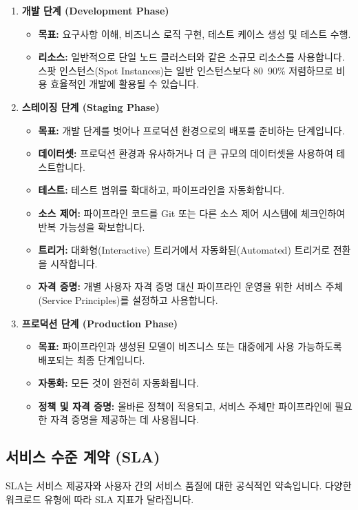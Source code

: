 \documentclass[11pt,a4paper]{article}
\theoremstyle{definition}
\begin{document}
\begin{enumerate}
    \item \textbf{개발 단계 (Development Phase)}
    \begin{itemize}
        \item \textbf{목표:} 요구사항 이해, 비즈니스 로직 구현, 테스트 케이스 생성 및 테스트 수행.
        \item \textbf{리소스:} 일반적으로 단일 노드 클러스터와 같은 소규모 리소스를 사용합니다. 스팟 인스턴스(Spot Instances)는 일반 인스턴스보다 80~90\% 저렴하므로 비용 효율적인 개발에 활용될 수 있습니다.
    \end{itemize}

    \item \textbf{스테이징 단계 (Staging Phase)}
    \begin{itemize}
        \item \textbf{목표:} 개발 단계를 벗어나 프로덕션 환경으로의 배포를 준비하는 단계입니다.
        \item \textbf{데이터셋:} 프로덕션 환경과 유사하거나 더 큰 규모의 데이터셋을 사용하여 테스트합니다.
        \item \textbf{테스트:} 테스트 범위를 확대하고, 파이프라인을 자동화합니다.
        \item \textbf{소스 제어:} 파이프라인 코드를 Git 또는 다른 소스 제어 시스템에 체크인하여 반복 가능성을 확보합니다.
        \item \textbf{트리거:} 대화형(Interactive) 트리거에서 자동화된(Automated) 트리거로 전환을 시작합니다.
        \item \textbf{자격 증명:} 개별 사용자 자격 증명 대신 파이프라인 운영을 위한 서비스 주체(Service Principles)를 설정하고 사용합니다.
    \end{itemize}

    \item \textbf{프로덕션 단계 (Production Phase)}
    \begin{itemize}
        \item \textbf{목표:} 파이프라인과 생성된 모델이 비즈니스 또는 대중에게 사용 가능하도록 배포되는 최종 단계입니다.
        \item \textbf{자동화:} 모든 것이 완전히 자동화됩니다.
        \item \textbf{정책 및 자격 증명:} 올바른 정책이 적용되고, 서비스 주체만 파이프라인에 필요한 자격 증명을 제공하는 데 사용됩니다.
    \end{itemize}
\end{enumerate}

\subsection{서비스 수준 계약 (SLA)}
SLA는 서비스 제공자와 사용자 간의 서비스 품질에 대한 공식적인 약속입니다. 다양한 워크로드 유형에 따라 SLA 지표가 달라집니다.
\end{document}
